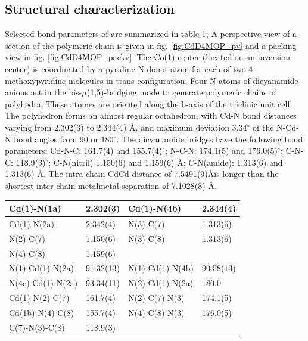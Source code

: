\subsection{Structural characterization}
 Selected bond parameters of  are summarized in table \ref{batab:CdD4MOP}, A perspective view of a section of the polymeric chain is given in fig. \ref{fig:CdD4MOP_pv} and a packing view in fig. \ref{fig:CdD4MOP_packv}.  The Co(1) center (located on an inversion center) is coordinated by a pyridine N donor atom for each of two 4-methoxypyridine molecules in trans configuration. Four N atoms of dicyanamide anions act in the bis-$\mu$(1,5)-bridging mode to generate polymeric chains of polyhedra. These atomes are oriented along the b-axis of the triclinic unit cell. The  polyhedron forms an almost regular octahedron, with Cd-N bond distances varying from 2.302(3) to 2.344(4) \AA, and maximum deviation 3.34$^\circ$ of the N-Cd-N bond angles from 90 or 180$^\circ$. The dicyanamide bridges have the following bond parameters: Cd-N-C: 161.7(4) and 155.7(4)$^\circ$; N-C-N: 174.1(5) and 176.0(5)$^\circ$; C-N-C: 118.9(3)$^\circ$; C-N(nitril) 1.150(6) and 1.159(6) \AA; C-N(amide): 1.313(6) and 1.313(6) \AA. The intra-chain Cd\ce{***}Cd distance of 7.5491(9)\AA  is longer than the shortest inter-chain metal\ce{***}metal separation of 7.1028(8) \AA. 

\renewcommand{\arraystretch}{1.5}
\begin{table}[htpb!]
\centering
{}
\begin{tabular}{|l|l|l|l|}
\hline
Cd(1)-N(1a) & 2.302(3) & Cd(1)-N(4b) & 2.344(4)\\
\hline
Cd(1)-N(2a) & 2.342(4) & N(3)-C(7) & 1.313(6)\\
\hline
N(2)-C(7) & 1.150(6) & N(3)-C(8) & 1.313(6)\\
\hline
N(4)-C(8) & 1.159(6) &  & \\
\hline
\hline
N(1)-Cd(1)-N(2a) & 91.32(13) & N(1)-Cd(1)-N(4b) & 90.58(13)\\
\hline
N(4c)-Cd(1)-N(2a) & 93.34(11) & N(2)-Cd(1)-N(2a) & 180.0\\
\hline
Cd(1)-N(2)-C(7) & 161.7(4) & N(2)-C(7)-N(3) & 174.1(5)\\
\hline
Cd(1b)-N(4)-C(8) & 155.7(4) & N(4)-C(8)-N(3) & 176.0(5)\\
\hline
C(7)-N(3)-C(8) & 118.9(3) &  & \\
\hline
\end{tabular}

\label{batab:CdD4MOP}
\end{table}

